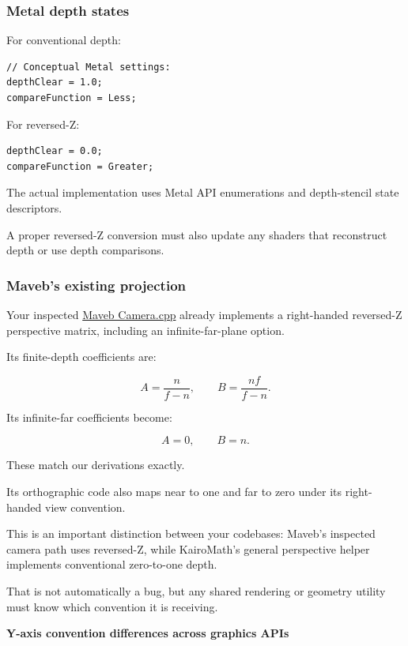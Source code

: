 \subsubsection{Metal depth states}\label{metal-depth-states}

For conventional depth:

\begin{verbatim}
// Conceptual Metal settings:
depthClear = 1.0;
compareFunction = Less;
\end{verbatim}

For reversed-Z:

\begin{verbatim}
depthClear = 0.0;
compareFunction = Greater;
\end{verbatim}

The actual implementation uses Metal API enumerations and depth-stencil state descriptors.

A proper reversed-Z conversion must also update any shaders that reconstruct depth or use depth comparisons.

\subsubsection{Maveb's existing projection}\label{mavebs-existing-projection}

Your inspected \href{https://github.com/swayam8624/Maveb/blob/main/engine/scene/src/Camera.cpp?utm_source=chatgpt.com}{Maveb Camera.cpp} already implements a right-handed reversed-Z perspective matrix, including an infinite-far-plane option.

Its finite-depth coefficients are:

\[
 \boxed{ A=\frac n{f-n}, \qquad B=\frac{nf}{f-n} }.
\]

Its infinite-far coefficients become:

\[
 \boxed{ A=0,\qquad B=n }.
\]

These match our derivations exactly.

Its orthographic code also maps near to one and far to zero under its right-handed view convention.

This is an important distinction between your codebases: Maveb's inspected camera path uses reversed-Z, while KairoMath's general perspective helper implements conventional zero-to-one depth.

That is not automatically a bug, but any shared rendering or geometry utility must know which convention it is receiving.

\textbf{Y-axis convention differences across graphics APIs}

